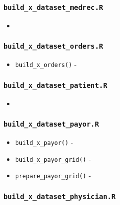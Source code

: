 \documentclass[
]{book}
\providecommand{\tightlist}{%
  \setlength{\itemsep}{0pt}\setlength{\parskip}{0pt}}
\begin{document}
\hypertarget{build_x_dataset_medrec.r}{%
\subsubsection{\texorpdfstring{\texttt{build\_x\_dataset\_medrec.R}}{build\_x\_dataset\_medrec.R}}\label{build_x_dataset_medrec.r}}

\begin{itemize}
\item
\end{itemize}

\hypertarget{build_x_dataset_orders.r}{%
\subsubsection{\texorpdfstring{\texttt{build\_x\_dataset\_orders.R}}{build\_x\_dataset\_orders.R}}\label{build_x_dataset_orders.r}}

\begin{itemize}
\tightlist
\item
  \texttt{build\_x\_orders()} -
\end{itemize}

\hypertarget{build_x_dataset_patient.r}{%
\subsubsection{\texorpdfstring{\texttt{build\_x\_dataset\_patient.R}}{build\_x\_dataset\_patient.R}}\label{build_x_dataset_patient.r}}

\begin{itemize}
\item
\end{itemize}

\hypertarget{build_x_dataset_payor.r}{%
\subsubsection{\texorpdfstring{\texttt{build\_x\_dataset\_payor.R}}{build\_x\_dataset\_payor.R}}\label{build_x_dataset_payor.r}}

\begin{itemize}
\tightlist
\item
  \texttt{build\_x\_payor()} -
\item
  \texttt{build\_x\_payor\_grid()} -
\item
  \texttt{prepare\_payor\_grid()} -
\end{itemize}

\hypertarget{build_x_dataset_physician.r}{%
\subsubsection{\texorpdfstring{\texttt{build\_x\_dataset\_physician.R}}{build\_x\_dataset\_physician.R}}\label{build_x_dataset_physician.r}}
\end{document}
